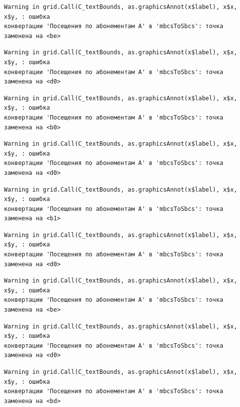 \documentclass[
  letterpaper,
  DIV=11,
  numbers=noendperiod]{scrreprt}
\begin{document}
\begin{verbatim}
Warning in grid.Call(C_textBounds, as.graphicsAnnot(x$label), x$x, x$y, : ошибка
конвертации 'Посещения по абонементам А' в 'mbcsToSbcs': точка заменена на <be>
\end{verbatim}

\begin{verbatim}
Warning in grid.Call(C_textBounds, as.graphicsAnnot(x$label), x$x, x$y, : ошибка
конвертации 'Посещения по абонементам А' в 'mbcsToSbcs': точка заменена на <d0>
\end{verbatim}

\begin{verbatim}
Warning in grid.Call(C_textBounds, as.graphicsAnnot(x$label), x$x, x$y, : ошибка
конвертации 'Посещения по абонементам А' в 'mbcsToSbcs': точка заменена на <b0>
\end{verbatim}

\begin{verbatim}
Warning in grid.Call(C_textBounds, as.graphicsAnnot(x$label), x$x, x$y, : ошибка
конвертации 'Посещения по абонементам А' в 'mbcsToSbcs': точка заменена на <d0>
\end{verbatim}

\begin{verbatim}
Warning in grid.Call(C_textBounds, as.graphicsAnnot(x$label), x$x, x$y, : ошибка
конвертации 'Посещения по абонементам А' в 'mbcsToSbcs': точка заменена на <b1>
\end{verbatim}

\begin{verbatim}
Warning in grid.Call(C_textBounds, as.graphicsAnnot(x$label), x$x, x$y, : ошибка
конвертации 'Посещения по абонементам А' в 'mbcsToSbcs': точка заменена на <d0>
\end{verbatim}

\begin{verbatim}
Warning in grid.Call(C_textBounds, as.graphicsAnnot(x$label), x$x, x$y, : ошибка
конвертации 'Посещения по абонементам А' в 'mbcsToSbcs': точка заменена на <be>
\end{verbatim}

\begin{verbatim}
Warning in grid.Call(C_textBounds, as.graphicsAnnot(x$label), x$x, x$y, : ошибка
конвертации 'Посещения по абонементам А' в 'mbcsToSbcs': точка заменена на <d0>
\end{verbatim}

\begin{verbatim}
Warning in grid.Call(C_textBounds, as.graphicsAnnot(x$label), x$x, x$y, : ошибка
конвертации 'Посещения по абонементам А' в 'mbcsToSbcs': точка заменена на <bd>
\end{verbatim}
\end{document}

